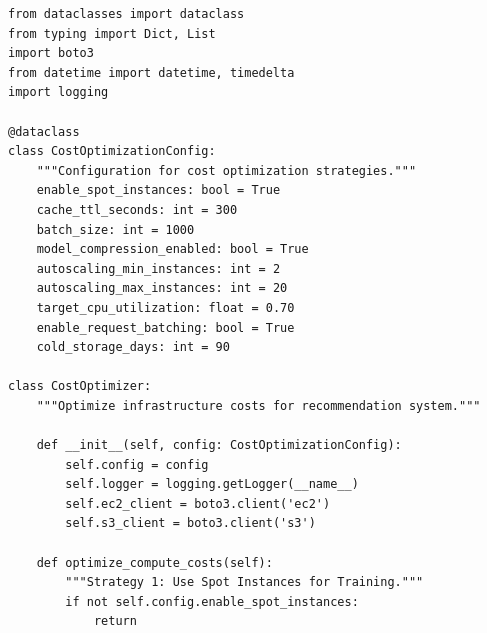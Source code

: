 \begin{lstlisting}[style=python, caption=Cost Optimization Implementation]
from dataclasses import dataclass
from typing import Dict, List
import boto3
from datetime import datetime, timedelta
import logging

@dataclass
class CostOptimizationConfig:
    """Configuration for cost optimization strategies."""
    enable_spot_instances: bool = True
    cache_ttl_seconds: int = 300
    batch_size: int = 1000
    model_compression_enabled: bool = True
    autoscaling_min_instances: int = 2
    autoscaling_max_instances: int = 20
    target_cpu_utilization: float = 0.70
    enable_request_batching: bool = True
    cold_storage_days: int = 90

class CostOptimizer:
    """Optimize infrastructure costs for recommendation system."""

    def __init__(self, config: CostOptimizationConfig):
        self.config = config
        self.logger = logging.getLogger(__name__)
        self.ec2_client = boto3.client('ec2')
        self.s3_client = boto3.client('s3')

    def optimize_compute_costs(self):
        """Strategy 1: Use Spot Instances for Training."""
        if not self.config.enable_spot_instances:
            return


\end{lstlisting}
